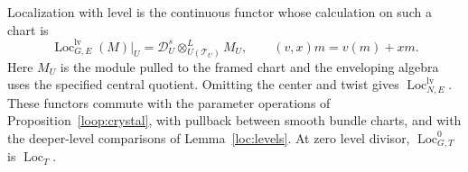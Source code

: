 \begin{proposition}\label{loc:construction}
Localization with level is the continuous functor whose calculation
on such a chart is
\begin{equation}\label{eq:T2}
 \operatorname{Loc}_{G,E}^{\mathrm{lv}}(M)|_U
   =\mathscr D_U^s\otimes^L_{U(\mathcal T_U)}M_U,
 \qquad (v,x)m=v(m)+xm.
\end{equation}
Here $M_U$ is the module pulled to the framed chart and the enveloping
algebra uses the specified central quotient.  Omitting the center and
twist gives $\operatorname{Loc}_{N,E}^{\mathrm{lv}}$.
These functors commute with the parameter operations of
Proposition~\ref{loop:crystal}, with pullback between smooth bundle charts, and with
the deeper-level comparisons of Lemma~\ref{loc:levels}.
At zero level divisor, $\operatorname{Loc}_{G,T}^0$ is
$\operatorname{Loc}_T$.
\end{proposition}

